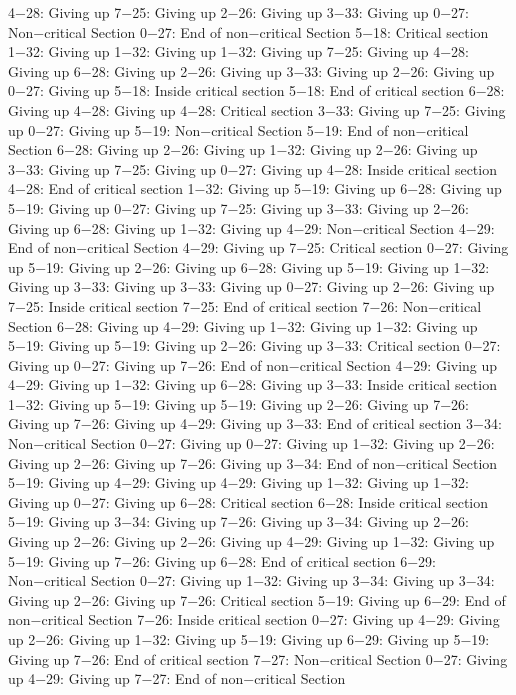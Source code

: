 4−28: Giving up
7−25: Giving up
2−26: Giving up
3−33: Giving up
0−27: Non−critical Section
0−27: End of non−critical Section
5−18: Critical section
1−32: Giving up
1−32: Giving up
1−32: Giving up
7−25: Giving up
4−28: Giving up
6−28: Giving up
2−26: Giving up
3−33: Giving up
2−26: Giving up
0−27: Giving up
5−18: Inside critical section
5−18: End of critical section
6−28: Giving up
4−28: Giving up
4−28: Critical section
3−33: Giving up
7−25: Giving up
0−27: Giving up
5−19: Non−critical Section
5−19: End of non−critical Section
6−28: Giving up
2−26: Giving up
1−32: Giving up
2−26: Giving up
3−33: Giving up
7−25: Giving up
0−27: Giving up
4−28: Inside critical section
4−28: End of critical section
1−32: Giving up
5−19: Giving up
6−28: Giving up
5−19: Giving up
0−27: Giving up
7−25: Giving up
3−33: Giving up
2−26: Giving up
6−28: Giving up
1−32: Giving up
4−29: Non−critical Section
4−29: End of non−critical Section
4−29: Giving up
7−25: Critical section
0−27: Giving up
5−19: Giving up
2−26: Giving up
6−28: Giving up
5−19: Giving up
1−32: Giving up
3−33: Giving up
3−33: Giving up
0−27: Giving up
2−26: Giving up
7−25: Inside critical section
7−25: End of critical section
7−26: Non−critical Section
6−28: Giving up
4−29: Giving up
1−32: Giving up
1−32: Giving up
5−19: Giving up
5−19: Giving up
2−26: Giving up
3−33: Critical section
0−27: Giving up
0−27: Giving up
7−26: End of non−critical Section
4−29: Giving up
4−29: Giving up
1−32: Giving up
6−28: Giving up
3−33: Inside critical section
1−32: Giving up
5−19: Giving up
5−19: Giving up
2−26: Giving up
7−26: Giving up
7−26: Giving up
4−29: Giving up
3−33: End of critical section
3−34: Non−critical Section
0−27: Giving up
0−27: Giving up
1−32: Giving up
2−26: Giving up
2−26: Giving up
7−26: Giving up
3−34: End of non−critical Section
5−19: Giving up
4−29: Giving up
4−29: Giving up
1−32: Giving up
1−32: Giving up
0−27: Giving up
6−28: Critical section
6−28: Inside critical section
5−19: Giving up
3−34: Giving up
7−26: Giving up
3−34: Giving up
2−26: Giving up
2−26: Giving up
2−26: Giving up
4−29: Giving up
1−32: Giving up
5−19: Giving up
7−26: Giving up
6−28: End of critical section
6−29: Non−critical Section
0−27: Giving up
1−32: Giving up
3−34: Giving up
3−34: Giving up
2−26: Giving up
7−26: Critical section
5−19: Giving up
6−29: End of non−critical Section
7−26: Inside critical section
0−27: Giving up
4−29: Giving up
2−26: Giving up
1−32: Giving up
5−19: Giving up
6−29: Giving up
5−19: Giving up
7−26: End of critical section
7−27: Non−critical Section
0−27: Giving up
4−29: Giving up
7−27: End of non−critical Section
